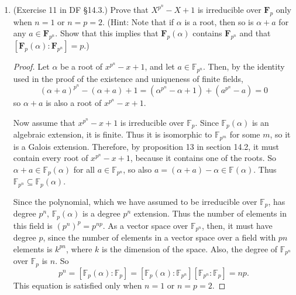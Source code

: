 \documentclass[10pt]{article}
\begin{document}
\begin{enumerate}
\begin{proof}
If $\varphi(a + b\alpha + c\alpha^2) = a - b\beta + c\beta^2 = 0$, then $a = b = c = 0$ because $\{1, \beta, \beta^2 \}$ is linearly independent over $\mathbb{F}_3$.  Therefore, $\varphi$ is injective.  Since $\mathbb{F}_3(\alpha)$ and $\mathbb{F}_3(\beta)$ are both extensions of degree 3 over $\mathbb{F}_3$, they both have cardinality $3^3$, so $\varphi$ must also be surjective, thus an isomorphism.

\end{proof}

\item (Exercise 11 in DF \S 14.3.) Prove that $X^{p^n}-X+1$ is irreducible over $\mathbf{F}_p$ only when $n=1$ or $n=p=2$.  (Hint: Note that if $\alpha$ is a root, then so is $\alpha+a$ for any $a \in \mathbf{F}_{p^n}$.  Show that this implies that $\mathbf{F}_p(\alpha)$ contains $\mathbf{F}_{p^n}$ and that $[\mathbf{F}_p(\alpha):\mathbf{F}_{p^n}] = p$.)

\begin{proof}

Let $\alpha$ be a root of $x^{p^n}-x+1$, and let $a \in \mathbb{F}_{p^n}$.  Then, by the identity used in the proof of the existence and uniqueness of finite fields,
$$
(\alpha + a)^{p^n} - (\alpha + a) + 1 = (\alpha^{p^n} - \alpha + 1) + (a^{p^n} - a) = 0
$$
so $\alpha + a$ is also a root of $x^{p^n}-x+1$.

Now assume that $x^{p^n}-x+1$ is irreducible over $\mathbb{F}_p$.  Since $\mathbb{F}_p(\alpha)$ is an algebraic extension, it is finite.  Thus it is isomorphic to $\mathbb{F}_{p^m}$ for some $m$, so it is a Galois extension.  Therefore, by proposition 13 in section 14.2, it must contain every root of $x^{p^n}-x+1$, because it contains one of the roots.  So $\alpha + a \in \mathbb{F}_p(\alpha)$ for all $a \in \mathbb{F}_{p^n}$, so also $a = (\alpha + a) - \alpha \in \mathbb{F}(\alpha)$.  Thus $\mathbb{F}_{p^n} \subseteq \mathbb{F}_p(\alpha)$.


Since the polynomial, which we have assumed to be irreducible over $\mathbb{F}_p$, has degree $p^n$, $\mathbb{F}_p(\alpha)$ is a degree $p^n$ extension.  Thus the number of elements in this field is $(p^n)^p = p^{np}$.  As a vector space over $\mathbb{F}_{p^n}$, then, it must have degree $p$, since the number of elements in a vector space over a field with $pn$ elements is $k^{pn}$, where $k$ is the dimension of the space.  Also, the degree of $\mathbb{F}_{p^n}$ over $\mathbb{F}_p$ is $n$.  So $$p^n = [\mathbb{F}_p(\alpha) : \mathbb{F}_p] = [\mathbb{F}_p(\alpha) : \mathbb{F}_{p^n}][\mathbb{F}_{p^n} : \mathbb{F}_p] = np.$$  This equation is satisfied only when $n=1$ or $n = p = 2$.


\end{proof}
\end{enumerate}
\end{document}
